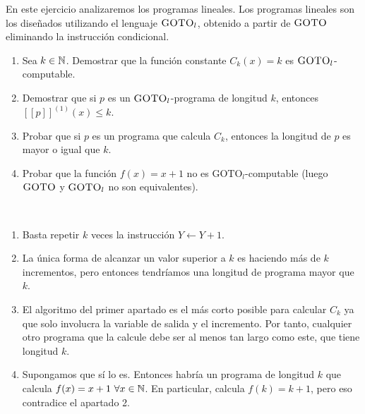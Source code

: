 \documentclass[twoside]{article}
\begin{document}
\begin{ejercicio}{15}
En este ejercicio analizaremos los programas lineales. Los programas lineales son
los diseñados utilizando el lenguaje $\textsc{GOTO}_l$, obtenido a partir de $\textsc{GOTO}$ eliminando la instrucción
condicional.
\begin{enumerate}
\item Sea $k\in \mathbb{N}$. Demostrar que la función constante $C_k(x) = k$ es $\textsc{GOTO}_l$-computable.
\item Demostrar que si $p$ es un $\textsc{GOTO}_l$-programa de longitud $k$, entonces $[[p]]^{(1)}(x) \leq k$.
\item Probar que si $p$ es un programa que calcula $C_k$, entonces la longitud de $p$ es mayor o igual
que $k$.
\item Probar que la función $f(x) = x + 1$ no es $\text{GOTO}_l$-computable (luego $\textsc{GOTO}$ y $\textsc{GOTO}_l$ no son
equivalentes).
\end{enumerate}
\end{ejercicio}
\begin{solucion}\
\begin{enumerate}
\item Basta repetir $k$ veces la instrucción $Y\leftarrow Y+1$.
\item La única forma de alcanzar un valor superior a $k$ es haciendo más de $k$ incrementos, pero entonces tendríamos una longitud de programa mayor que $k$. 
\item El algoritmo del primer apartado es el más corto posible para calcular $C_k$ ya que solo involucra la variable de salida y el incremento. Por tanto, cualquier otro programa que la calcule debe ser al menos tan largo como este, que tiene longitud $k$. 
\item Supongamos que sí lo es. Entonces habría un programa de longitud $k$ que calcula $f(x)=x+1\ \forall x\in\mathbb{N}$. En particular, calcula $f(k)=k+1$, pero eso contradice el apartado 2.
\end{enumerate}
\end{solucion}
\end{document}

